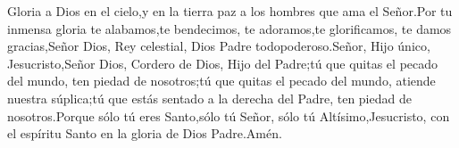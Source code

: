%
%

\be Gloria a Dios en el cielo,\redast y en la tierra paz a los hombres que ama el Señor.\redast Por tu inmensa gloria te alabamos,\redast te bendecimos, te adoramos,\redast te glorificamos, te damos gracias,\redast Señor Dios, Rey celestial, Dios Padre todopoderoso.\redast Señor, Hijo único, Jesucristo,\redast Señor Dios, Cordero de Dios, Hijo del Padre;\redast tú que quitas el pecado del mundo, ten piedad de nosotros;\redast tú que quitas el pecado del mundo, atiende nuestra súplica;\redast tú que estás sentado a la derecha del Padre, ten piedad de nosotros.\redast Porque sólo tú eres Santo,\redast sólo tú Señor, sólo tú Altísimo,\redast Jesucristo, con el espíritu Santo en la gloria de Dios Padre.\redast Amén.
